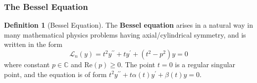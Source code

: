 \documentclass{article}
\theoremstyle{remark}
\theoremstyle{definition}
\newtheorem{definition}{Definition}[section]
\begin{document}
    \subsubsection{The Bessel Equation}

      \begin{definition}[Bessel Equation]
      The \textbf{Bessel equation} arises in a natural way in many mathematical physics problems having axial/cylindrical symmetry, and is written in the form 
      \[\mathcal{L}_n (y) = t^2 y^{\prime\prime} + t y^\prime + (t^2 - p^2) y = 0\]
      where constant $p \in \mathbb{C}$ and Re$(p) \geq 0$. The point $t = 0$ is a regular singular point, and the equation is of form $t^2 y^{\prime\prime} + t \alpha(t) y^\prime + \beta(t) y = 0$. 
      \end{definition}
\end{document}
